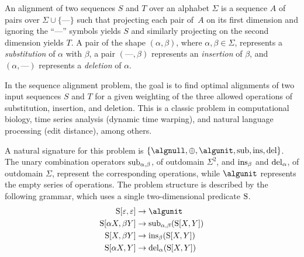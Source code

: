\begin{example}\label{ex:seq-align}
    An alignment of two sequences \(S\) and \(T\) over an alphabet \(\Sigma\) is a sequence \(A\) of pairs over \(\Sigma \cup \{\text{---}\}\) such that
    projecting each pair of~\(A\) on its first dimension and ignoring the \enquote{---} symbols yields \(S\)
    and similarly projecting on the second dimension yields \(T\).
    A pair of the shape
    \((\alpha, \beta)\), where \(\alpha,\beta\in\Sigma\), represents a \emph{substitution} of \(\alpha\) with \(\beta\),
    a pair \((\text{---}, \beta)\) represents an \emph{insertion} of \(\beta\),
    and \((\alpha, \text{---})\) represents a \emph{deletion} of \(\alpha\).

    In the sequence alignment problem, the goal is to find optimal alignments of two input sequences \(S\) and \(T\) for a given weighting of the three allowed operations of substitution, insertion, and deletion.
    This is a classic problem in computational biology, time series analysis (dynamic time warping), and natural language processing (edit distance), among others.

    A natural signature for this problem is
    \(\{\algnull, \algplus, \algunit, \algsym{sub}, \algsym{ins}, \algsym{del}\}\).
    The unary combination operators \(\mathrm{\operatorname{sub}}_{\alpha,\beta}\), of outdomain \(\Sigma^2\), and \(\mathrm{\operatorname{ins}}_\beta\) and \(\mathrm{\operatorname{del}}_\alpha\), of outdomain \(\Sigma\), represent the corresponding operations, while \(\algunit\) represents the empty series of operations.
    The problem structure is described by the following grammar, which uses a single two-dimensional predicate \(\mathrm{S}\).
    \begin{align*}
        \gramnt{S}[\varepsilon, \varepsilon] &\rightarrow
            \algunit \\
        \gramnt{S}[\alpha X, \beta Y] &\rightarrow
            \algsym{sub}_{\alpha, \beta}(\gramnt{S}[X, Y]) \\
        \gramnt{S}[X, \beta Y] &\rightarrow
            \algsym{ins}_{\beta}(\gramnt{S}[X, Y]) \\
        \gramnt{S}[\alpha X, Y] &\rightarrow
            \algsym{del}_{\alpha}(\gramnt{S}[X, Y])
    \end{align*}


\end{example}

